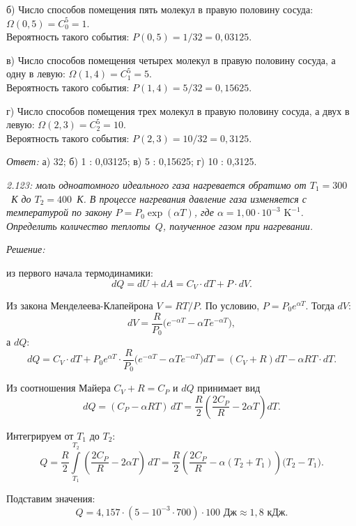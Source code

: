 \documentclass[pscyr]{hedsemwork}
\begin{document}
б) Число способов помещения пять молекул в правую половину сосуда:
\( \Omega(0, 5) = C_0^5 = 1 \).\\
Вероятность такого события: \( P(0, 5) = 1/32 = 0,\!03125 \).

в) Число способов помещения четырех молекул в правую половину сосуда, а одну в
левую: \( \Omega(1, 4) = C_1^5 = 5 \).\\
Вероятность такого события: \( P(1, 4) = 5/32 = 0,\!15625 \).

г) Число способов помещения трех молекул в правую половину сосуда, а двух в
левую: \( \Omega(2, 3) = C_2^5 = 10 \).\\
Вероятность такого события: \( P(2, 3) = 10/32 = 0,\!3125 \).

\vspace*{2em}
\emph{Ответ:} а) 32; б) 1 : 0,03125; в) 5 : 0,15625; г) 10 : 0,3125.

\newpage %

\emph{2.123: моль одноатомного идеального газа нагревается обратимо от
\( T_1 = 300 \)~К до \( T_2 = 400 \)~К. В процессе нагревания давление газа
изменяется с температурой по закону \( P = P_0 \exp(\alpha T) \), где
\( \alpha = 1,\!00 \cdot 10^{-3} \text{ K}^{-1} \). Определить количество
теплоты~\( Q \), полученное газом при нагревании.}

\vspace*{2em}
\emph{Решение:}

из первого начала термодинамики:
\[
  dQ = dU + dA = C_V\cdot dT + P\cdot dV.
\]

Из закона Менделеева-Клапейрона \( V = RT/P \). По условию,
\( P = P_0e^{\alpha T} \). Тогда \( dV \):
\[
  dV = \frac{R}{P_0} \Big( e^{-\alpha T} - \alpha Te^{-\alpha T} \Big),
\]
а \( dQ \):
\[
  dQ = C_V\cdot dT + P_0e^{\alpha T}\cdot \frac{R}{P_0}\Big( e^{-\alpha T} -
  \alpha Te^{-\alpha T} \Big)dT = (C_V + R)dT - \alpha RT\cdot dT.
\]

Из соотношения Майера \( C_V + R = C_P \) и \( dQ \) принимает вид
\[
  dQ = (C_P - \alpha RT)\,dT = \frac{R}{2}\left(\frac{2C_P}{R} -
  2\alpha T\right)dT.
\]

Интегрируем от \( T_1 \) до \( T_2 \):
\[
  Q = \frac{R}{2}\int\limits_{T_1}^{T_2} \left(\frac{2C_P}{R} -
  2\alpha T\right)\,dT = \frac{R}{2}\left(\frac{2C_P}{R} - \alpha
  (T_2 + T_1)\right)\bigg(T_2 - T_1\bigg).
\]

Подставим значения:
\[
  Q = 4,\!157\cdot(5 - 10^{-3}\cdot 700) \cdot 100 \text{ Дж} \approx 1,\!8
  \text{ кДж}.
\]
\end{document}
